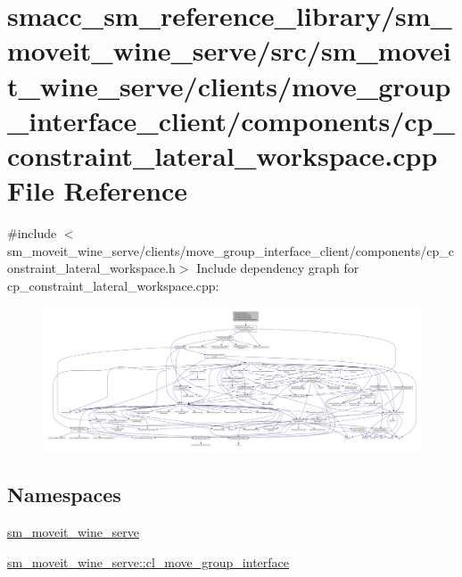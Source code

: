 \hypertarget{sm__moveit__wine__serve_2src_2sm__moveit__wine__serve_2clients_2move__group__interface__client_241f5590ea02f1d65431008d4c2689f32}{}\section{smacc\+\_\+sm\+\_\+reference\+\_\+library/sm\+\_\+moveit\+\_\+wine\+\_\+serve/src/sm\+\_\+moveit\+\_\+wine\+\_\+serve/clients/move\+\_\+group\+\_\+interface\+\_\+client/components/cp\+\_\+constraint\+\_\+lateral\+\_\+workspace.cpp File Reference}
\label{sm__moveit__wine__serve_2src_2sm__moveit__wine__serve_2clients_2move__group__interface__client_241f5590ea02f1d65431008d4c2689f32}
{\ttfamily \#include $<$sm\+\_\+moveit\+\_\+wine\+\_\+serve/clients/move\+\_\+group\+\_\+interface\+\_\+client/components/cp\+\_\+constraint\+\_\+lateral\+\_\+workspace.\+h$>$}\newline
Include dependency graph for cp\+\_\+constraint\+\_\+lateral\+\_\+workspace.\+cpp\+:
\nopagebreak
\begin{figure}[H]
\begin{center}
\leavevmode
\includegraphics[width=350pt]{sm__moveit__wine__serve_2src_2sm__moveit__wine__serve_2clients_2move__group__interface__client_2890e4b9611b8c4b16e560944429f2ed9}
\end{center}
\end{figure}
\subsection*{Namespaces}
\begin{DoxyCompactItemize}
\item 
 \hyperlink{namespacesm__moveit__wine__serve}{sm\+\_\+moveit\+\_\+wine\+\_\+serve}
\item 
 \hyperlink{namespacesm__moveit__wine__serve_1_1cl__move__group__interface}{sm\+\_\+moveit\+\_\+wine\+\_\+serve\+::cl\+\_\+move\+\_\+group\+\_\+interface}
\end{DoxyCompactItemize}
